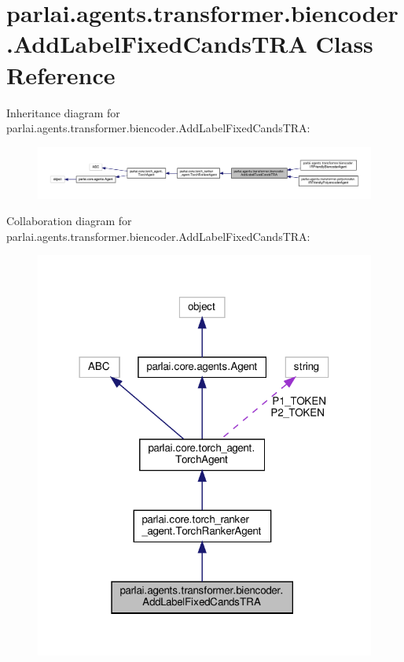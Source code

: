 \hypertarget{classparlai_1_1agents_1_1transformer_1_1biencoder_1_1AddLabelFixedCandsTRA}{}\section{parlai.\+agents.\+transformer.\+biencoder.\+Add\+Label\+Fixed\+Cands\+T\+RA Class Reference}
\label{classparlai_1_1agents_1_1transformer_1_1biencoder_1_1AddLabelFixedCandsTRA}


Inheritance diagram for parlai.\+agents.\+transformer.\+biencoder.\+Add\+Label\+Fixed\+Cands\+T\+RA\+:
\nopagebreak
\begin{figure}[H]
\begin{center}
\leavevmode
\includegraphics[width=350pt]{df/ddc/classparlai_1_1agents_1_1transformer_1_1biencoder_1_1AddLabelFixedCandsTRA__inherit__graph}
\end{center}
\end{figure}


Collaboration diagram for parlai.\+agents.\+transformer.\+biencoder.\+Add\+Label\+Fixed\+Cands\+T\+RA\+:
\nopagebreak
\begin{figure}[H]
\begin{center}
\leavevmode
\includegraphics[width=318pt]{de/d98/classparlai_1_1agents_1_1transformer_1_1biencoder_1_1AddLabelFixedCandsTRA__coll__graph}
\end{center}
\end{figure}
